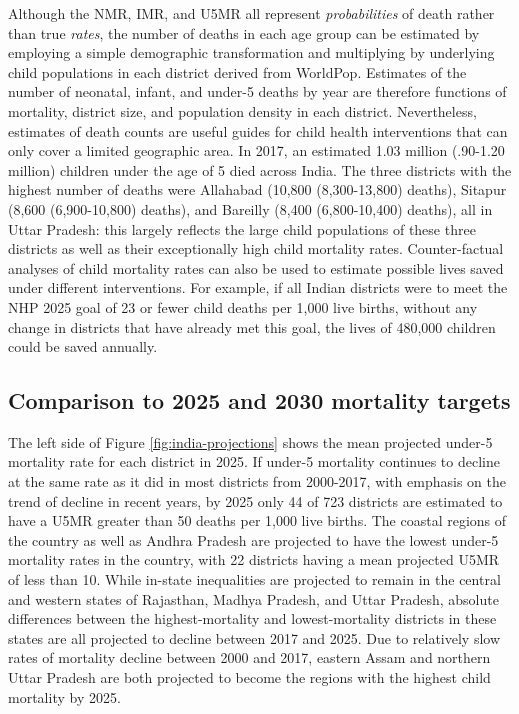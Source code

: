 \documentclass[
]{report}
\begin{document}
Although the NMR, IMR, and U5MR all represent \emph{probabilities} of death rather than true \emph{rates}, the number of deaths in each age group can be estimated by employing a simple demographic transformation and multiplying by underlying child populations in each district derived from WorldPop.\autocite{Tatem2017,Burstein2019} Estimates of the number of neonatal, infant, and under-5 deaths by year are therefore functions of mortality, district size, and population density in each district. Nevertheless, estimates of death counts are useful guides for child health interventions that can only cover a limited geographic area. In 2017, an estimated 1.03 million (.90-1.20 million) children under the age of 5 died across India. The three districts with the highest number of deaths were Allahabad (10,800 (8,300-13,800) deaths), Sitapur (8,600 (6,900-10,800) deaths), and Bareilly (8,400 (6,800-10,400) deaths), all in Uttar Pradesh: this largely reflects the large child populations of these three districts as well as their exceptionally high child mortality rates. Counter-factual analyses of child mortality rates can also be used to estimate possible lives saved under different interventions. For example, if all Indian districts were to meet the NHP 2025 goal of 23 or fewer child deaths per 1,000 live births, without any change in districts that have already met this goal, the lives of 480,000 children could be saved annually.

\hypertarget{comparison-to-2025-and-2030-mortality-targets}{%
\subsection{Comparison to 2025 and 2030 mortality targets}\label{comparison-to-2025-and-2030-mortality-targets}}

The left side of Figure \ref{fig:india-projections} shows the mean projected under-5 mortality rate for each district in 2025. If under-5 mortality continues to decline at the same rate as it did in most districts from 2000-2017, with emphasis on the trend of decline in recent years, by 2025 only 44 of 723 districts are estimated to have a U5MR greater than 50 deaths per 1,000 live births. The coastal regions of the country as well as Andhra Pradesh are projected to have the lowest under-5 mortality rates in the country, with 22 districts having a mean projected U5MR of less than 10. While in-state inequalities are projected to remain in the central and western states of Rajasthan, Madhya Pradesh, and Uttar Pradesh, absolute differences between the highest-mortality and lowest-mortality districts in these states are all projected to decline between 2017 and 2025. Due to relatively slow rates of mortality decline between 2000 and 2017, eastern Assam and northern Uttar Pradesh are both projected to become the regions with the highest child mortality by 2025.
\end{document}
